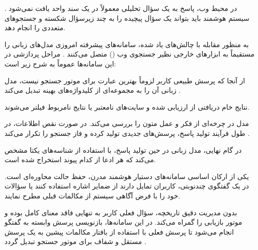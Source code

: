   در محیط وب، پاسخ به یک سؤال تحلیلی معمولاً در یک سند واحد یافت نمی‌شود \cite{yang2018hotpotqa}. سیستم هوشمند باید بتواند یک سؤال پیچیده را به چند زیرسؤال شکسته و جستجوهای متعددی را انجام دهد.



به منظور مقابله با چالش‌های یاد شده، سامانه‌های پیشرفته امروزی مدل‌های زبانی را مستقیماً به ابزارهای خارجی نظیر جستجوی وب () متصل می‌کنند \cite{nakano2021webgpt, schick2023toolformer}. مراحل پردازشی در این سامانه‌ها عموماً به شرح زیر است:


  از آنجا که پرسش طبیعی کاربر لزوماً بهترین عبارت برای موتور جستجو نیست، مدل زبانی آن را به مجموعه‌ای از کلیدواژه‌های بهینه تبدیل می‌کند \cite{ma2023query}.

  نتایج خام دریافتی از  ارزیابی شده و سایت‌های نامعتبر یا نتایج نامربوط فیلتر می‌شوند.

  مدل در چرخه‌ای از فکر و عمل \cite{yao2023react} متون را بررسی می‌کند. در صورت نقص اطلاعات، در طول فرآیند تولید پاسخ، پرسش‌های جدیدی تولید کرده و فاز جستجو را تکرار می‌کند \cite{jiang2023active}.

  در گام نهایی، مدل زبانی در حین تولید پاسخ، با استفاده از شناسه‌های یکتا مشخص می‌کند که هر ادعا از کدام پیوند استخراج شده است.



یکی از ارکان اساسی سامانه‌های دستیار هوشمند مدرن، حفظ حالت محاوره‌ای است. در یک گفتگوی چندنوبتی، کاربران تمایل دارند از ضمایر اشاره استفاده کنند یا سؤالات خود را با فرض آگاهی سیستم از مکالمات قبلی مطرح نمایند. 

بدون مدیریت دقیق تاریخچه، سؤال فعلی کاربر به تنهایی فاقد معنای کامل بوده و موتور بازیابی را گمراه می‌کند. در این سامانه‌ها، بازنویسی پرسش وابسته به گفتگو انجام می‌شود تا پرسش فعلی با استفاده از بافتار مکالمات پیشین به یک پرسش مستقل و شفاف برای موتور جستجو تبدیل گردد \cite{wu2022conqrr}.

